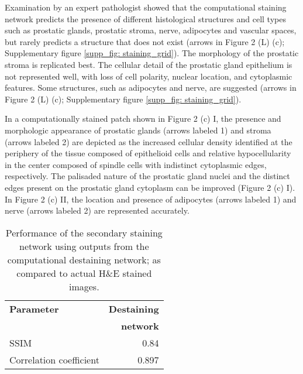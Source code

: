 \documentclass[10pt, conference, compsocconf]{IEEEtran}
\begin{document}
Examination by an expert pathologist showed that the computational staining network predicts the presence of different histological structures and cell types such as prostatic glands, prostatic stroma, nerve, adipocytes and vascular spaces, but rarely predicts a structure that does not exist (arrows in Figure 2 (L) (c); Supplementary figure \ref{supp_fig: staining_grid}). The morphology of the prostatic stroma is replicated best. The cellular detail of the prostatic gland epithelium is not represented well, with loss of cell polarity, nuclear location, and cytoplasmic features. Some structures, such as adipocytes and nerve, are suggested (arrows in Figure 2 (L) (c); Supplementary figure \ref{supp_fig: staining_grid}).

In a computationally stained patch shown in Figure 2 (c) I, the presence and morphologic appearance of prostatic glands (arrows labeled 1) and stroma (arrows labeled 2) are depicted as the increased cellular density identified at the periphery of the tissue composed of epithelioid cells and relative hypocellularity in the center composed of spindle cells with indistinct cytoplasmic edges, respectively. The palisaded nature of the prostatic gland nuclei and the distinct edges present on the prostatic gland cytoplasm can be improved (Figure 2 (c) I). In Figure 2 (c) II, the location and presence of adipocytes (arrows labeled 1) and nerve (arrows labeled 2) are represented accurately.

\begin{table}
    \caption{Performance of the secondary staining network using outputs from the computational destaining network; as compared to actual H\&E stained images.}
    \begin{tabular*}{\linewidth}{l @{\extracolsep{\fill}}r}
        \hline
        \textbf{Parameter} & \textbf{Destaining} \\
        & \textbf{network} \\
        \hline
        SSIM 					& 0.84 \\
        Correlation coefficient & 0.897 \\
        \hline
    \end{tabular*}
    \label{table: destaining_model_results}
\end{table}
\end{document}
